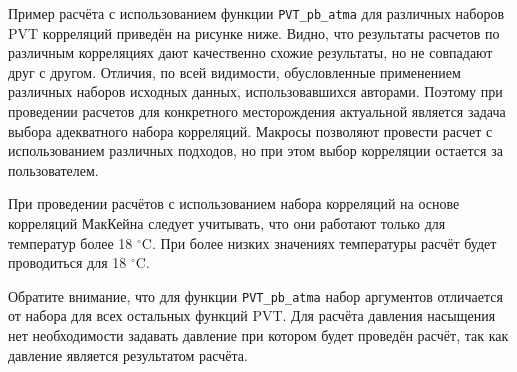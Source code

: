 
Пример расчёта с использованием функции \texttt{PVT_pb_atma} для различных наборов PVT корреляций приведён на рисунке ниже. Видно, что результаты расчетов по различным корреляциях дают качественно схожие результаты, но не совпадают друг с другом.  Отличия, по всей видимости,  обусловленные применением различных наборов исходных данных, использовавшихся авторами. Поэтому при проведении расчетов для конкретного месторождения актуальной является задача выбора адекватного набора корреляций. Макросы \unf{} позволяют провести расчет с использованием различных подходов, но при этом выбор корреляции остается за пользователем. 



При проведении расчётов с использованием набора корреляций на основе корреляций МакКейна следует учитывать, что они работают только для температур более 18 $^\circ$C. При более низких значениях температуры расчёт будет проводиться для 18 $^\circ$C.

Обратите внимание, что для функции \texttt{PVT_pb_atma} набор аргументов отличается от набора для всех остальных функций PVT. Для расчёта давления насыщения нет необходимости задавать давление при котором будет проведён расчёт, так как давление является результатом расчёта.

